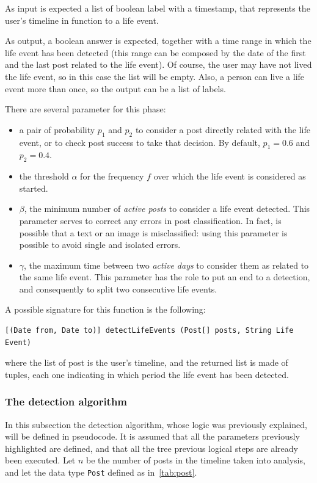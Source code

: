As input is expected a list of boolean label with a timestamp, that represents the user's timeline in function to a life event.

As output, a boolean answer is expected, together with a time range in which the life event has been detected (this range can be composed by the date of the first and the last post related to the life event). Of course, the user may have not lived the life event, so in this case the list will be empty. Also, a person can live a life event more than once, so the output can be a list of labels.

There are several parameter for this phase: 
\begin{itemize}
\item a pair of probability $p_1$ and $p_2$ to consider a post directly related with the life event, or to check post success to take that decision. By default, $p_1 = 0.6$ and $p_2 = 0.4$.
\item the threshold $\alpha$ for the frequency $f$ over which the life event is considered as started.
\item $\beta$, the minimum number of \textit{active posts} to consider a life event detected. This parameter serves to correct any errors in post classification. In fact, is possible that a text or an image is misclassified: using this parameter is possible to avoid single and isolated errors.
\item $\gamma$, the maximum time between two \textit{active days} to consider them as related to the same life event. This parameter has the role to put an end to a detection, and consequently to split two consecutive life events.
\end{itemize}

A possible signature for this function is the following:
\begin{Verbatim}
[(Date from, Date to)] detectLifeEvents (Post[] posts, String Life Event)
\end{Verbatim}
where the list of post is the user's timeline, and the returned list is made of tuples, each one indicating in which period the life event has been detected.

\subsubsection{The detection algorithm}

In this subsection the detection algorithm, whose logic was previously explained, will be defined in pseudocode. It is assumed that all the parameters previously highlighted are defined, and that all the tree previous logical steps are already been executed. Let $n$ be the number of posts in the timeline taken into analysis, and let the data type \texttt{Post} defined as in~\ref{tab:post}.

